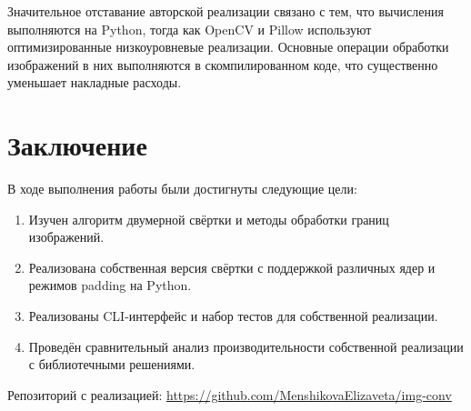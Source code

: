 \documentclass[a4paper, 12pt]{article}
\begin{document}
Значительное отставание авторской реализации связано с тем, что вычисления выполняются на Python, тогда как OpenCV и Pillow используют оптимизированные низкоуровневые реализации. Основные операции обработки изображений в них выполняются в скомпилированном коде, что существенно уменьшает накладные расходы.

\section{Заключение}

В ходе выполнения работы были достигнуты следующие цели:

\begin{enumerate}
    \item Изучен алгоритм двумерной свёртки и методы обработки границ изображений.
    \item Реализована собственная версия свёртки с поддержкой различных ядер и режимов padding на Python.
    \item Реализованы CLI-интерфейс и набор тестов для собственной реализации.
    \item  Проведён сравнительный анализ производительности собственной реализации с библиотечными решениями.
\end{enumerate}

Репозиторий с реализацией: \url{https://github.com/MenshikovaElizaveta/img-conv}
\end{document}
